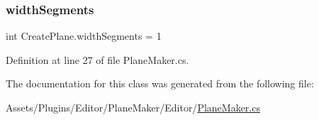 \subsubsection{\texorpdfstring{width\+Segments}{widthSegments}}
{\footnotesize\ttfamily int Create\+Plane.\+width\+Segments = 1}



Definition at line 27 of file Plane\+Maker.\+cs.



The documentation for this class was generated from the following file\+:\begin{DoxyCompactItemize}
\item 
Assets/\+Plugins/\+Editor/\+Plane\+Maker/\+Editor/\mbox{\hyperlink{_plane_maker_8cs}{Plane\+Maker.\+cs}}\end{DoxyCompactItemize}
